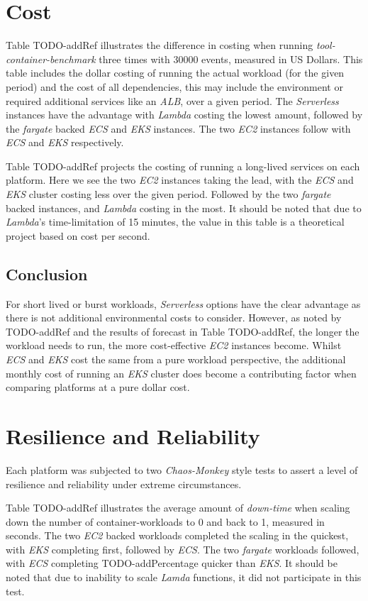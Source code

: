 \section{Cost}
Table TODO-addRef illustrates the difference in costing when running \emph{tool-container-benchmark} three times with 30000 events, measured in US Dollars.
This table includes the dollar costing of running the actual workload (for the given period) and the cost of all dependencies,
this may include the environment or required additional services like an \textit{ALB}, over a given period.
The \textit{Serverless} instances have the advantage with \textit{Lambda} costing the lowest amount, followed by the \textit{fargate} backed \textit{ECS} and \textit{EKS} instances.
The two \textit{EC2} instances follow with \textit{ECS} and \textit{EKS} respectively.

Table TODO-addRef projects the costing of running a long-lived services on each platform. Here we see the two \textit{EC2} instances taking the lead,
with the \textit{ECS} and \textit{EKS} cluster costing less over the given period. Followed by the two \textit{fargate} backed instances, and \textit{Lambda} costing in the most.
It should be noted that due to \textit{Lambda}'s time-limitation of 15 minutes, the value in this table is a theoretical project based on cost per second.

\subsection*{Conclusion}
For short lived or burst workloads, \textit{Serverless} options have the clear advantage as there is not additional environmental costs to consider.
However, as noted by TODO-addRef and the results of forecast in Table TODO-addRef, the longer the workload needs to run, the more cost-effective \textit{EC2} instances become.
Whilst \textit{ECS} and \textit{EKS} cost the same from a pure workload perspective, the additional monthly cost of running an \textit{EKS} cluster does become a contributing factor
when comparing platforms at a pure dollar cost.

\section{Resilience and Reliability}
Each platform was subjected to two \textit{Chaos-Monkey} style tests to assert a level of resilience and reliability under extreme circumstances.

Table TODO-addRef illustrates the average amount of \textit{down-time} when scaling down the number of container-workloads to 0 and back to 1, measured in seconds.
The two \textit{EC2} backed workloads completed the scaling in the quickest, with \textit{EKS} completing first, followed by \textit{ECS}.
The two \textit{fargate} workloads followed, with \textit{ECS} completing TODO-addPercentage quicker than \textit{EKS}.
It should be noted that due to inability to scale \textit{Lamda} functions, it did not participate in this test.


